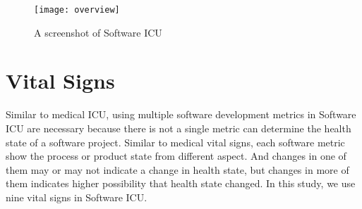 \begin{figure}[htbp]
   \centering
   \texttt{[image: overview]}
   \caption{A screenshot of Software ICU}
   \label{fig:overview}
\end{figure}

\section{Vital Signs}
\label{vitalSign}

Similar to medical ICU, using multiple software development metrics in Software ICU are necessary because there is not a single metric can determine the health state of a software project. Similar to medical vital signs, each software metric show the process or product state from different aspect. And changes in one of them may or may not indicate a change in health state, but changes in more of them indicates higher possibility that health state changed. In this study, we use nine vital signs in Software ICU.


